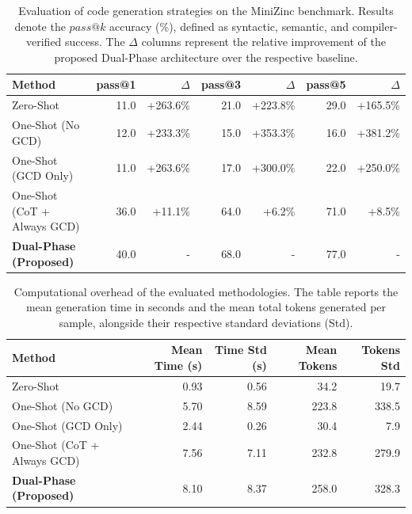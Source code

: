 \begin{table}[htbp]
  \centering
  \caption{Evaluation of code generation strategies on the MiniZinc benchmark. Results denote the $pass@k$ accuracy (\%), defined as syntactic, semantic, and compiler-verified success. The $\Delta$ columns represent the relative improvement of the proposed Dual-Phase architecture over the respective baseline.}
  \label{tab:pass_at_k}
  \begin{tabular}{l r r r r r r}
    \toprule
    \textbf{Method} & \textbf{pass@1} & \textbf{$\Delta$} & \textbf{pass@3} & \textbf{$\Delta$} & \textbf{pass@5} & \textbf{$\Delta$} \\
    \midrule
    Zero-Shot & 11.0 & +263.6\% & 21.0 & +223.8\% & 29.0 & +165.5\% \\
    One-Shot (No GCD) & 12.0 & +233.3\% & 15.0 & +353.3\% & 16.0 & +381.2\% \\
    One-Shot (GCD Only) & 11.0 & +263.6\% & 17.0 & +300.0\% & 22.0 & +250.0\% \\
    One-Shot (CoT + Always GCD) & 36.0 & +11.1\% & 64.0 & +6.2\% & 71.0 & +8.5\% \\
    \textbf{Dual-Phase (Proposed)} & 40.0 & - & 68.0 & - & 77.0 & - \\
    \bottomrule
  \end{tabular}
\end{table}

\vspace{1em}

\begin{table}[htbp]
  \centering
  \caption{Computational overhead of the evaluated methodologies. The table reports the mean generation time in seconds and the mean total tokens generated per sample, alongside their respective standard deviations (Std).}
  \label{tab:computational_overhead}
  \begin{tabular}{l r r r r}
    \toprule
    \textbf{Method} & \textbf{Mean Time (s)} & \textbf{Time Std (s)} & \textbf{Mean Tokens} & \textbf{Tokens Std} \\
    \midrule
    Zero-Shot & 0.93 & 0.56 & 34.2 & 19.7 \\
    One-Shot (No GCD) & 5.70 & 8.59 & 223.8 & 338.5 \\
    One-Shot (GCD Only) & 2.44 & 0.26 & 30.4 & 7.9 \\
    One-Shot (CoT + Always GCD) & 7.56 & 7.11 & 232.8 & 279.9 \\
    \textbf{Dual-Phase (Proposed)} & 8.10 & 8.37 & 258.0 & 328.3 \\
    \bottomrule
  \end{tabular}
\end{table}

